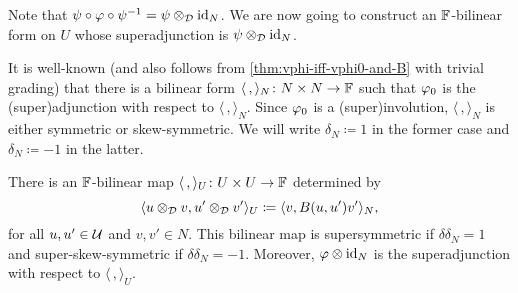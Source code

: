 Note that $\psi \circ \varphi \circ \psi^{-1} = \psi\otimes_{\mathcal{D}} \operatorname{id}_N$. 
We are now going to construct an $\mathbb{F}$-bilinear form on $U$ whose superadjunction is $\psi\otimes_{\mathcal{D}} \operatorname{id}_N$. 

It is well-known (and also follows from \cref{thm:vphi-iff-vphi0-and-B} with trivial grading) that there is a bilinear form $\langle \, , \rangle_N \colon N\times N \to \mathbb{F}$ such that $\varphi_0$ is the (super)adjunction with respect to $\langle \, , \rangle_N$. 
Since $\varphi_0$ is a (super)involution, $\langle \, , \rangle_N$ is either symmetric or skew-symmetric. 
We will write $\delta_N \coloneqq 1$ in the former case and $\delta_N \coloneqq -1$ in the latter. 

\begin{lemma}\label{lemma:the-same-vphi}
    There is an $\mathbb{F}$-bilinear map $\langle \, , \rangle_U \colon U\times U \to \mathbb{F}$ determined by 
    \[
        \langle u \otimes_{\mathcal{D}} v , u' \otimes_{\mathcal{D}} v' \rangle_U \coloneqq \langle v , B(u, u') v' \rangle_N,
    \]
    for all $u, u'\in \mathcal U$ and $v, v' \in N$. 
    This bilinear map is supersymmetric if $\delta \delta_N =1$ and super-skew-symmetric if $\delta \delta_N = -1$. 
    Moreover, $\varphi \otimes \operatorname{id}_N$ is the superadjunction with respect to $\langle \, , \rangle_U$. 
\end{lemma}

